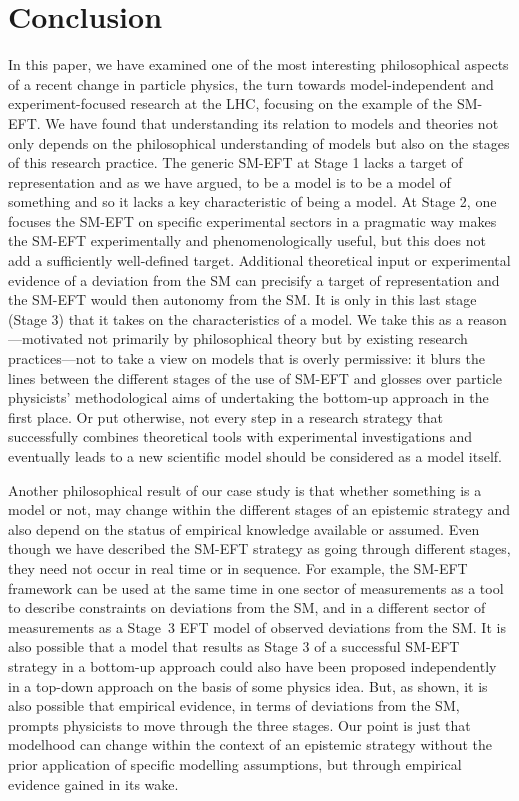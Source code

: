 \section{Conclusion}


In this paper, we have examined one of the most interesting philosophical aspects of a recent change in particle physics, the turn towards model-independent and experiment-focused research at the LHC, focusing on the example of the SM-EFT. 
We have found that understanding its relation to models and theories not only depends on the philosophical understanding of models but also on the stages of this research practice. 
The generic SM-EFT at Stage 1 lacks a target of representation and as we have argued, to be a model is to be a model of something and so it lacks a key characteristic of being a model. 
At Stage 2, one focuses the SM-EFT on specific experimental sectors in a pragmatic way makes the SM-EFT experimentally and phenomenologically useful, but this does not add a sufficiently well-defined target. 
Additional theoretical input or experimental evidence of a deviation from the SM can precisify a target of representation and the SM-EFT would then autonomy from the SM. 
It is only in this last stage (Stage 3) that it takes on the characteristics of a model.
We take this as a reason---motivated not primarily by philosophical theory but by existing research practices---not to take a view on models that is overly permissive: it blurs the lines between the different stages of the use of SM-EFT and glosses over particle physicists' methodological aims of undertaking the bottom-up approach in the first place. 
Or put otherwise, not every step in a research strategy that successfully combines theoretical tools with experimental investigations and eventually leads to a new scientific model should be considered as a model itself.

Another philosophical result of our case study is that whether something is a model or not, may change within the different stages of an epistemic strategy and also depend on the status of empirical knowledge available or assumed.
Even though we have described the SM-EFT strategy as going through different stages, they need not occur in real time or in sequence. 
For example, the SM-EFT framework can be used at the same time in one sector of measurements as a tool to describe constraints on deviations from the SM, and in a different sector of measurements as a Stage~3 EFT model of observed deviations from the SM.
It is also possible that a model that results as Stage 3 of a successful SM-EFT strategy in a bottom-up approach could also have been proposed independently in a top-down approach on the basis of some physics idea.
But, as shown, it is also possible that empirical evidence, in terms of deviations from the SM, prompts physicists to move through the three stages. 
Our point is just that modelhood can change within the context of an epistemic strategy without the prior application of specific modelling assumptions, but through empirical evidence gained in its wake.







